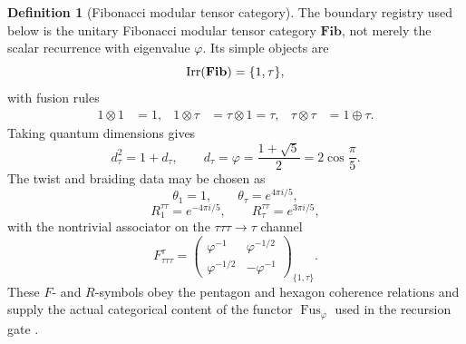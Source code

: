 \documentclass[aps,prd,reprint,nofootinbib,superscriptaddress,floatfix]{revtex4-2}
\numberwithin{equation}{section}
\theoremstyle{definition}
\newtheorem{definition}{Definition}[section]
\theoremstyle{plain}
\begin{document}
\begin{definition}[Fibonacci modular tensor category]
\label{def:fib-mtc}
The boundary registry used below is the unitary Fibonacci modular tensor
category \(\mathbf{Fib}\), not merely the scalar recurrence with
eigenvalue \(\varphi\).  Its simple objects are
\begin{equation}
{\rm Irr}(\mathbf{Fib})=\{1,\tau\},
\end{equation}
with fusion rules
\begin{align}
1\otimes1&=1,&
1\otimes\tau&=\tau\otimes1=\tau,&
\tau\otimes\tau&=1\oplus\tau .
\end{align}
Taking quantum dimensions gives
\begin{equation}
d_\tau^2=1+d_\tau,\qquad
d_\tau=\varphi=\frac{1+\sqrt5}{2}=2\cos\frac{\pi}{5}.
\end{equation}
The twist and braiding data may be chosen as
\begin{equation}
\theta_1=1,\qquad
\theta_\tau=e^{4\pi i/5},
\end{equation}
\begin{equation}
R^{\tau\tau}_{1}=e^{-4\pi i/5},
\qquad
R^{\tau\tau}_{\tau}=e^{3\pi i/5},
\end{equation}
with the nontrivial associator on the \(\tau\tau\tau\to\tau\) channel
\begin{equation}
F^{\tau}_{\tau\tau\tau}
=
\begin{pmatrix}
\varphi^{-1} & \varphi^{-1/2}\\[2pt]
\varphi^{-1/2} & -\varphi^{-1}
\end{pmatrix}_{\{1,\tau\}} .
\end{equation}
These \(F\)- and \(R\)-symbols obey the pentagon and hexagon coherence
relations and supply the actual categorical content of the functor
\(\operatorname{Fus}_\varphi\) used in the recursion gate
\cite{NayakEtAl2008,FreedmanLarsenWang2002,KauffmanLomonaco2008}.
\end{definition}
\end{document}
